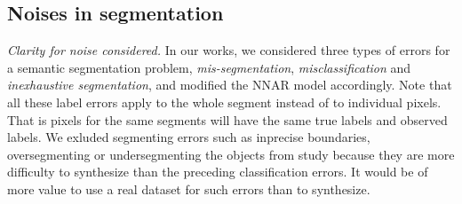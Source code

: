 \subsection{Noises in segmentation}
\label{subsec:noises}
\noindent \textit{Clarity for noise considered.}
\noindent
In our works, we considered three types of errors for a semantic segmentation problem, \textit{mis-segmentation}, \textit{misclassification} and \textit{inexhaustive segmentation}, and modified the NNAR model accordingly.
Note that all these label errors apply to the whole segment instead of to individual pixels.
That is pixels for the same segments will have the same true labels and observed labels.
We exluded segmenting errors such as inprecise boundaries, oversegmenting or undersegmenting the objects from study because they are more difficulty to synthesize than the preceding classification errors.
It would be of more value to use a real dataset for such errors than to synthesize.



